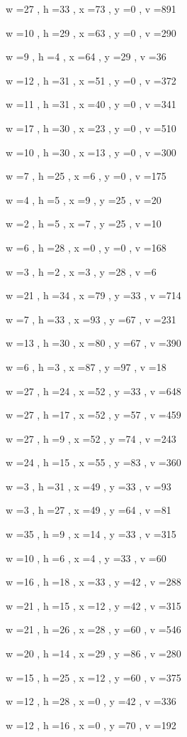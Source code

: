\documentclass[11pt]{article}
\begin{document}
w =27 , h =33 , x =73 , y =0 , v =891
\par
w =10 , h =29 , x =63 , y =0 , v =290
\par
w =9 , h =4 , x =64 , y =29 , v =36
\par
w =12 , h =31 , x =51 , y =0 , v =372
\par
w =11 , h =31 , x =40 , y =0 , v =341
\par
w =17 , h =30 , x =23 , y =0 , v =510
\par
w =10 , h =30 , x =13 , y =0 , v =300
\par
w =7 , h =25 , x =6 , y =0 , v =175
\par
w =4 , h =5 , x =9 , y =25 , v =20
\par
w =2 , h =5 , x =7 , y =25 , v =10
\par
w =6 , h =28 , x =0 , y =0 , v =168
\par
w =3 , h =2 , x =3 , y =28 , v =6
\par
w =21 , h =34 , x =79 , y =33 , v =714
\par
w =7 , h =33 , x =93 , y =67 , v =231
\par
w =13 , h =30 , x =80 , y =67 , v =390
\par
w =6 , h =3 , x =87 , y =97 , v =18
\par
w =27 , h =24 , x =52 , y =33 , v =648
\par
w =27 , h =17 , x =52 , y =57 , v =459
\par
w =27 , h =9 , x =52 , y =74 , v =243
\par
w =24 , h =15 , x =55 , y =83 , v =360
\par
w =3 , h =31 , x =49 , y =33 , v =93
\par
w =3 , h =27 , x =49 , y =64 , v =81
\par
w =35 , h =9 , x =14 , y =33 , v =315
\par
w =10 , h =6 , x =4 , y =33 , v =60
\par
w =16 , h =18 , x =33 , y =42 , v =288
\par
w =21 , h =15 , x =12 , y =42 , v =315
\par
w =21 , h =26 , x =28 , y =60 , v =546
\par
w =20 , h =14 , x =29 , y =86 , v =280
\par
w =15 , h =25 , x =12 , y =60 , v =375
\par
w =12 , h =28 , x =0 , y =42 , v =336
\par
w =12 , h =16 , x =0 , y =70 , v =192
\par
\newpage
\end{document}
